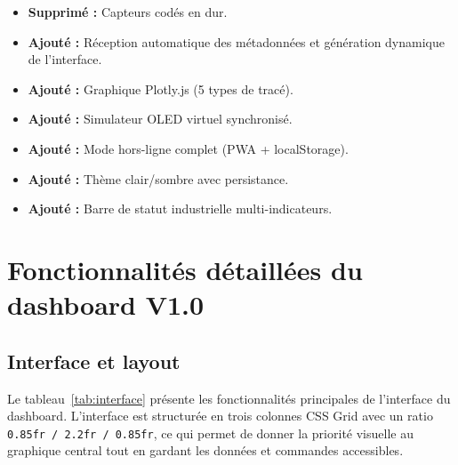 \documentclass[12pt, a4paper]{report}
\begin{document}
\begin{evolutionbox}
\begin{itemize}[leftmargin=0.8cm, itemsep=3pt]
  \item[\ding{55}] \textbf{Supprim\'e :} Capteurs cod\'es en dur.
  \item[\ding{51}] \textbf{Ajout\'e :} R\'eception automatique des
        m\'etadonn\'ees et g\'en\'eration dynamique de l'interface.
  \item[\ding{51}] \textbf{Ajout\'e :} Graphique Plotly.js (5 types
        de trac\'e).
  \item[\ding{51}] \textbf{Ajout\'e :} Simulateur OLED virtuel
        synchronis\'e.
  \item[\ding{51}] \textbf{Ajout\'e :} Mode hors-ligne complet
        (PWA + localStorage).
  \item[\ding{51}] \textbf{Ajout\'e :} Th\`eme clair/sombre avec
        persistance.
  \item[\ding{51}] \textbf{Ajout\'e :} Barre de statut industrielle
        multi-indicateurs.
\end{itemize}
\end{evolutionbox}

\section{Fonctionnalit\'es d\'etaill\'ees du dashboard V1.0}

\subsection{Interface et layout}

Le tableau~\ref{tab:interface} pr\'esente les fonctionnalit\'es
principales de l'interface du dashboard. L'interface est structur\'ee
en trois colonnes CSS Grid avec un ratio \texttt{0.85fr / 2.2fr /
0.85fr}, ce qui permet de donner la priorit\'e visuelle au graphique
central tout en gardant les donn\'ees et commandes accessibles.
\end{document}
